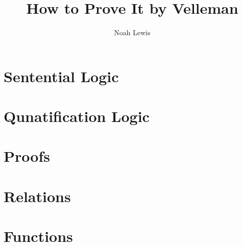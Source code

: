 \documentclass[10pt]{article}  %
\title{How to Prove It by Velleman}
\author{Noah Lewis}
\begin{document}
\maketitle

\tableofcontents

\section{Sentential Logic}

\section{Qunatification Logic}

\section{Proofs}

\section{Relations}

\section{Functions}

\end{document}
